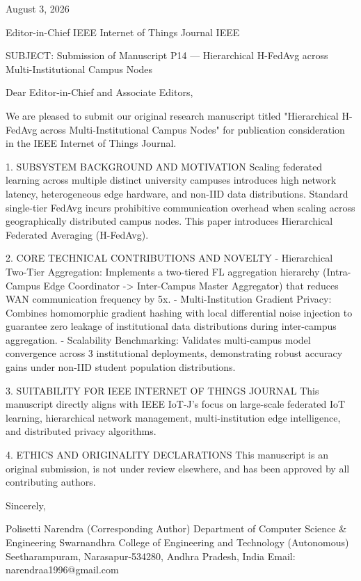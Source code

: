 August 3, 2026

Editor-in-Chief
IEEE Internet of Things Journal
IEEE

SUBJECT: Submission of Manuscript P14 — Hierarchical H-FedAvg across Multi-Institutional Campus Nodes

Dear Editor-in-Chief and Associate Editors,

We are pleased to submit our original research manuscript titled "Hierarchical H-FedAvg across Multi-Institutional Campus Nodes" for publication consideration in the IEEE Internet of Things Journal.

1. SUBSYSTEM BACKGROUND AND MOTIVATION
Scaling federated learning across multiple distinct university campuses introduces high network latency, heterogeneous edge hardware, and non-IID data distributions. Standard single-tier FedAvg incurs prohibitive communication overhead when scaling across geographically distributed campus nodes. This paper introduces Hierarchical Federated Averaging (H-FedAvg).

2. CORE TECHNICAL CONTRIBUTIONS AND NOVELTY
  - Hierarchical Two-Tier Aggregation: Implements a two-tiered FL aggregation hierarchy (Intra-Campus Edge Coordinator -> Inter-Campus Master Aggregator) that reduces WAN communication frequency by 5x.
  - Multi-Institution Gradient Privacy: Combines homomorphic gradient hashing with local differential noise injection to guarantee zero leakage of institutional data distributions during inter-campus aggregation.
  - Scalability Benchmarking: Validates multi-campus model convergence across 3 institutional deployments, demonstrating robust accuracy gains under non-IID student population distributions.

3. SUITABILITY FOR IEEE INTERNET OF THINGS JOURNAL
This manuscript directly aligns with IEEE IoT-J's focus on large-scale federated IoT learning, hierarchical network management, multi-institution edge intelligence, and distributed privacy algorithms.

4. ETHICS AND ORIGINALITY DECLARATIONS
This manuscript is an original submission, is not under review elsewhere, and has been approved by all contributing authors.

Sincerely,

Polisetti Narendra (Corresponding Author)
Department of Computer Science & Engineering
Swarnandhra College of Engineering and Technology (Autonomous)
Seetharampuram, Narasapur-534280, Andhra Pradesh, India
Email: narendraa1996@gmail.com
